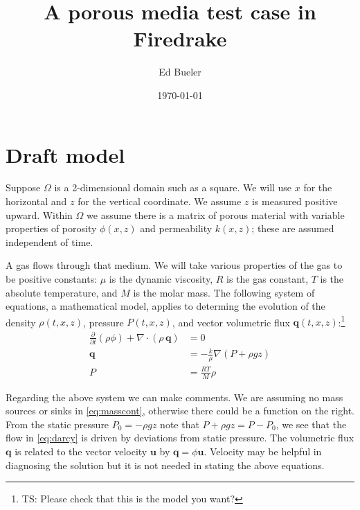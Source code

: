 \documentclass[11pt]{article}
\title{A porous media test case in Firedrake}
\author{Ed Bueler}
\date{\today}
\newcommand{\bq}{\mathbf{q}}
\newcommand{\bu}{\mathbf{u}}
\newcommand{\Div}{\nabla\cdot}
\newcommand{\grad}{\nabla}
\begin{document}
\maketitle

\thispagestyle{empty}

\section{Draft model}

Suppose $\Omega$ is a 2-dimensional domain such as a square.  We will use $x$ for the horizontal and $z$ for the vertical coordinate.  We assume $z$ is measured positive upward.  Within $\Omega$ we assume there is a matrix of porous material with variable properties of porosity $\phi(x,z)$ and permeability $k(x,z)$; these are assumed independent of time.

A gas flows through that medium.  We will take various properties of the gas to be positive constants: $\mu$ is the dynamic viscosity, $R$ is the gas constant, $T$ is the absolute temperature, and $M$ is the molar mass.  The following system of equations, a mathematical model, applies to determing the evolution of the density $\rho(t,x,z)$, pressure $P(t,x,z)$, and vector volumetric flux $\bq(t,x,z)$:\footnote{TS: Please check that this is the model you want?}
\begin{subequations}
\label{eq:pmtime:early}
\begin{align}
\frac{\partial}{\partial t} \left(\rho \phi\right) + \Div \left(\rho\, \bq\right) &= 0 \label{eq:masscont} \\
\bq &= - \frac{k}{\mu} \grad\left(P + \rho g z\right) \label{eq:darcy} \\
P &= \frac{RT}{M} \rho \label{eq:idealgas}
\end{align}
\end{subequations}

Regarding the above system we can make comments.  We are assuming no mass sources or sinks in \eqref{eq:masscont}, otherwise there could be a function on the right.  From the static pressure $P_0=-\rho g z$ note that $P+\rho g z = P-P_0$, we see that the flow in \eqref{eq:darcy} is driven by deviations from static pressure.  The volumetric flux $\bq$ is related to the vector velocity $\bu$ by $\bq = \phi \bu$.  Velocity may be helpful in diagnosing the solution but it is not needed in stating the above equations.
\end{document}
